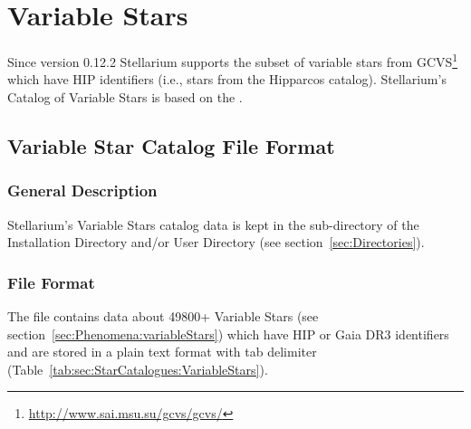 \clearpage

\section{Variable Stars}
\label{sec:StarCatalogues:VariableStars}

Since version 0.12.2 Stellarium supports the subset of variable stars
from GCVS\footnote{\url{http://www.sai.msu.su/gcvs/gcvs/}} which have HIP
identifiers (i.e., stars from the Hipparcos catalog). Stellarium's Catalog
of Variable Stars is based on the .

\subsection{Variable Star Catalog File Format}
\label{sec:StarCatalogues:VariableStars:format}

\subsubsection{General Description}%
\label{sec:StarCatalogues:VariableStars:general}

Stellarium's Variable Stars catalog data is kept
in the  sub-directory of the Installation Directory and/or
User Directory (see section~\ref{sec:Directories}).


\subsubsection{File Format}%
\label{sec:StarCatalogues:VariableStars:file}

The  file contains data about 49800+ Variable Stars 
(see section~\ref{sec:Phenomena:variableStars}) which have HIP or Gaia DR3 identifiers and
are stored in a plain text format with tab delimiter (Table~\ref{tab:sec:StarCatalogues:VariableStars}).

